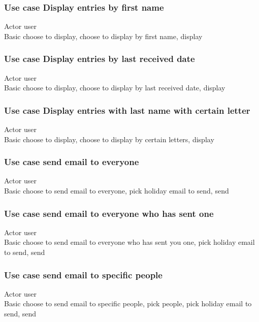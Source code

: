 \documentclass{article}
\begin{document}
\subsubsection*{Use case Display entries by first name}
Actor user \\
Basic choose to display, choose to display by first name, display \\
 
\subsubsection*{Use case Display entries by last received date}
Actor user \\
Basic choose to display, choose to display by last received date, display \\

\subsubsection*{Use case Display entries with last name with certain letter}
Actor user \\
Basic choose to display, choose to display by certain letters, display \\
 
\subsubsection*{Use case send email to everyone}
Actor user \\
Basic choose to send email to everyone, pick holiday email to send, send \\
 
\subsubsection*{Use case send email to everyone who has sent one}
Actor user \\
Basic choose to send email to everyone who has sent you one, pick holiday email to send, send \\
 
\subsubsection*{Use case send email to specific people}
Actor user \\
Basic choose to send email to specific people, pick people, pick holiday email to send, send \\
\end{document}
